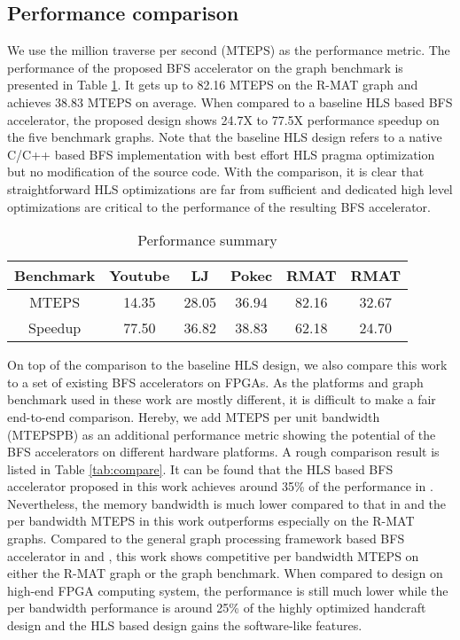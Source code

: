 \subsection{Performance comparison}
We use the million traverse per second (MTEPS) as 
the performance metric. The performance of the proposed BFS 
accelerator on the graph benchmark is 
presented in Table \ref{tab:performance-summary}. 
It gets up to 82.16 MTEPS on the R-MAT\uppercase\expandafter{} graph and achieves 
38.83 MTEPS on average. When compared to a baseline HLS based 
BFS accelerator, the proposed design shows 24.7X to 77.5X performance 
speedup on the five benchmark graphs. Note that the baseline HLS design 
refers to a native C/C++ based BFS implementation 
with best effort HLS pragma optimization but no modification of the source code.
With the comparison, it is clear that straightforward HLS optimizations 
are far from sufficient and dedicated high level optimizations are critical to 
the performance of the resulting BFS accelerator.
\begin{table}
    \centering
  \caption{Performance summary}
  \label{tab:performance-summary}
  \begin{tabular}{cccccc}
    \toprule
      Benchmark & Youtube & LJ & Pokec & RMAT\uppercase\expandafter{\romannumeral1} & RMAT\uppercase\expandafter{\romannumeral2} \\
    \midrule
      MTEPS & 14.35 & 28.05 & 36.94 & 82.16 & 32.67 \\
      Speedup & 77.50 & 36.82 & 38.83 & 62.18 & 24.70 \\
  \bottomrule
\end{tabular}
\end{table}

On top of the comparison to the baseline HLS design, we also compare 
this work to a set of existing BFS accelerators on FPGAs. As the platforms 
and graph benchmark used in these work are mostly different, it is 
difficult to make a fair end-to-end comparison. Hereby, we add
MTEPS per unit bandwidth (MTEPSPB) as an additional performance metric showing the 
potential of the BFS accelerators on different hardware platforms. 
A rough comparison result is listed in Table \ref{tab:compare}. It can be found that the HLS 
based BFS accelerator proposed in this work achieves around 35\% of the 
performance in \cite{zhang2017boosting}. Nevertheless, the memory bandwidth 
is much lower compared to that in \cite{zhang2017boosting} and the per bandwidth 
MTEPS in this work outperforms especially on the R-MAT graphs. Compared to the 
general graph processing framework based BFS accelerator in \cite{dai2016fpgp} and 
\cite{nurvitadhi2014graphgen}, this work shows competitive per bandwidth MTEPS on either 
the R-MAT graph or the graph benchmark. When compared to design on high-end 
FPGA computing system, the performance is still much lower while the per bandwidth 
performance is around 25\% of the highly optimized handcraft design and 
the HLS based design gains the software-like features.


